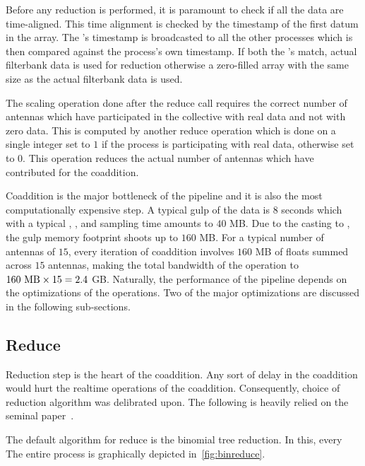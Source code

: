 \par Before any reduction is performed, it is paramount to check if all the data are time-aligned. 
This time alignment is checked by the \mjd timestamp of the first datum in the array. 
The \root's timestamp is broadcasted to all the other processes which is then compared against the process's own \mjd timestamp. 
If both the \mjd's match, actual filterbank data is used for reduction otherwise a zero-filled array with the same size as the actual filterbank data is used.

\par The scaling operation done after the \mpi reduce call requires the correct number of antennas which have participated in the collective with real data and not with zero data. 
This is computed by another \mpi reduce operation which is done on a single integer set to $1$ if the process is participating with real data, otherwise set to $0$. This operation reduces the actual number of antennas which have contributed for the coaddition.

\par Coaddition is the major bottleneck of the pipeline and it is also the most computationally expensive step. 
A typical gulp of the data is $8$ seconds which with a typical , , and sampling time amounts to $40$ MB.
Due to the casting to \float, the gulp memory footprint shoots up to $160$ MB.
For a typical number of antennas of $15$, every iteration of coaddition involves $160$ MB of floats summed across $15$ antennas, 
making the total bandwidth of the operation to $160\ {\rm MB} \times 15 = 2.4$ GB.
Naturally, the performance of the pipeline depends on the optimizations of the \mpi operations.
Two of the major optimizations are discussed in the following sub-sections.

\subsection {Reduce}
\label{ssub:reduce}

\par Reduction step is the heart of the coaddition. 
Any sort of delay in the coaddition would hurt the realtime operations of the coaddition. 
Consequently, choice of reduction algorithm was delibrated upon.
The following is heavily relied on the seminal paper~\cite{raben}.

\par The default \mpi algorithm for reduce is the binomial tree reduction. 
In this, every 
The entire process is graphically depicted in~\autoref{fig:binreduce}.

